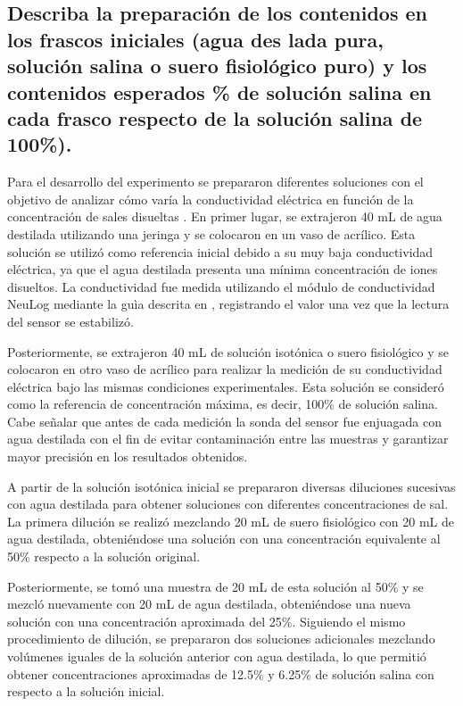 \documentclass[a4paper,openany,12pt]{book}
\begin{document}
\subsection{Describa la preparación de los contenidos en los frascos iniciales (agua des lada pura,
	solución salina o suero fisiológico puro) y los contenidos esperados \% de solución salina en
	cada frasco respecto de la solución salina de 100\%).}



Para el desarrollo del experimento se prepararon diferentes soluciones con el
objetivo de analizar cómo varía la conductividad eléctrica en función de la
concentración de sales disueltas \cite{atkins_physical_chemistry}. En primer lugar, se extrajeron 40 mL de agua
destilada utilizando una jeringa y se colocaron en un vaso de acrílico. Esta
solución se utilizó como referencia inicial debido a su muy baja conductividad
eléctrica, ya que el agua destilada presenta una mínima concentración de iones
disueltos. La conductividad fue medida utilizando el módulo de conductividad
NeuLog mediante la guìa descrita en \cite{neulog_conductivity}, registrando el valor una vez que la lectura del sensor se estabilizó.

Posteriormente, se extrajeron 40 mL de solución isotónica o suero fisiológico y
se colocaron en otro vaso de acrílico para realizar la medición de su
conductividad eléctrica bajo las mismas condiciones experimentales. Esta
solución se consideró como la referencia de concentración máxima, es decir,
100\% de solución salina. Cabe señalar que antes de cada medición la sonda del
sensor fue enjuagada con agua destilada con el fin de evitar contaminación entre
las muestras y garantizar mayor precisión en los resultados obtenidos.

A partir de la solución isotónica inicial se prepararon diversas diluciones
sucesivas con agua destilada para obtener soluciones con diferentes
concentraciones de sal. La primera dilución se realizó mezclando 20 mL de suero
fisiológico con 20 mL de agua destilada, obteniéndose una solución con una
concentración equivalente al 50\% respecto a la solución original. 

Posteriormente, se tomó una muestra de 20 mL de esta solución al 50\% y se
mezcló nuevamente con 20 mL de agua destilada, obteniéndose una nueva solución
con una concentración aproximada del 25\%. Siguiendo el mismo procedimiento de
dilución, se prepararon dos soluciones adicionales mezclando volúmenes iguales
de la solución anterior con agua destilada, lo que permitió obtener
concentraciones aproximadas de 12.5\% y 6.25\% de solución salina con respecto
a la solución inicial.
\end{document}
